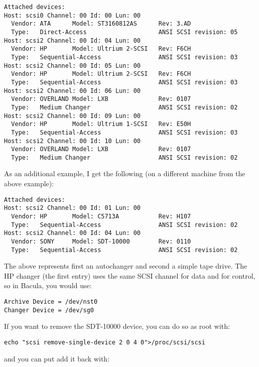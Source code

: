 \footnotesize
\begin{verbatim}
Attached devices:
Host: scsi0 Channel: 00 Id: 00 Lun: 00
  Vendor: ATA      Model: ST3160812AS      Rev: 3.AD
  Type:   Direct-Access                    ANSI SCSI revision: 05
Host: scsi2 Channel: 00 Id: 04 Lun: 00
  Vendor: HP       Model: Ultrium 2-SCSI   Rev: F6CH
  Type:   Sequential-Access                ANSI SCSI revision: 03
Host: scsi2 Channel: 00 Id: 05 Lun: 00
  Vendor: HP       Model: Ultrium 2-SCSI   Rev: F6CH
  Type:   Sequential-Access                ANSI SCSI revision: 03
Host: scsi2 Channel: 00 Id: 06 Lun: 00
  Vendor: OVERLAND Model: LXB              Rev: 0107
  Type:   Medium Changer                   ANSI SCSI revision: 02
Host: scsi2 Channel: 00 Id: 09 Lun: 00
  Vendor: HP       Model: Ultrium 1-SCSI   Rev: E50H
  Type:   Sequential-Access                ANSI SCSI revision: 03
Host: scsi2 Channel: 00 Id: 10 Lun: 00
  Vendor: OVERLAND Model: LXB              Rev: 0107
  Type:   Medium Changer                   ANSI SCSI revision: 02
\end{verbatim}
\normalsize


As an additional example, I get the following (on a different machine from the
above example):

\footnotesize
\begin{verbatim}
Attached devices:
Host: scsi2 Channel: 00 Id: 01 Lun: 00
  Vendor: HP       Model: C5713A           Rev: H107
  Type:   Sequential-Access                ANSI SCSI revision: 02
Host: scsi2 Channel: 00 Id: 04 Lun: 00
  Vendor: SONY     Model: SDT-10000        Rev: 0110
  Type:   Sequential-Access                ANSI SCSI revision: 02
\end{verbatim}
\normalsize

The above represents first an autochanger and second a simple
tape drive. The HP changer (the first entry) uses the same SCSI channel
for data and for control, so in Bacula, you would use:
\footnotesize
\begin{verbatim}
Archive Device = /dev/nst0
Changer Device = /dev/sg0
\end{verbatim}
\normalsize

If you want to remove the SDT-10000 device, you can do so as root with:

\footnotesize
\begin{verbatim}
echo "scsi remove-single-device 2 0 4 0">/proc/scsi/scsi
\end{verbatim}
\normalsize

and you can put add it back with:

